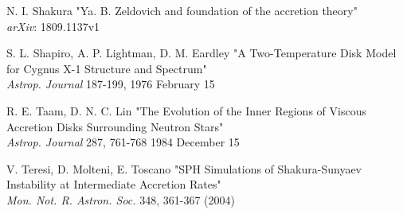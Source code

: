 \documentclass[a4paper]{article}
\begin{document}
\begin{thebibliography}{9}
	N. I. Shakura
	"Ya. B. Zeldovich and foundation of the accretion theory"\\
	\textit{arXiv}: 1809.1137v1

	S. L. Shapiro, A. P. Lightman, D. M. Eardley 
	"A Two-Temperature Disk Model for Cygnus X-1 Structure and Spectrum"\\
	\textit{Astrop. Journal} 187-199, 1976 February 15
	
	R. E. Taam, D. N. C. Lin 
	"The Evolution of the Inner Regions of Viscous Accretion Disks Surrounding Neutron Stars"\\
	\textit{Astrop. Journal} 287, 761-768 1984 December 15

	V. Teresi, D. Molteni, E. Toscano 
	"SPH Simulations of Shakura-Sunyaev Instability at Intermediate Accretion Rates"\\
	\textit{Mon. Not. R. Astron. Soc.} 348, 361-367 (2004)
\end{thebibliography}
\end{document}
